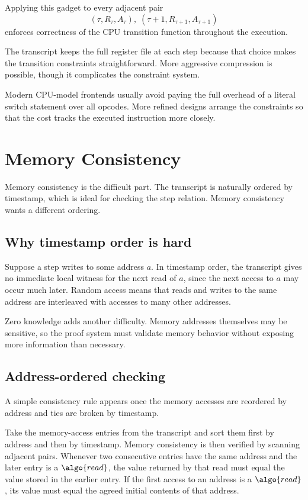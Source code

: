 \documentclass[11pt]{article}
\begin{document}
Applying this gadget to every adjacent pair
\[
  (\tau, R_\tau, A_\tau),\; (\tau+1, R_{\tau+1}, A_{\tau+1})
\]
enforces correctness of the CPU transition function throughout the execution.

The transcript keeps the full register file at each step because that choice makes the transition constraints straightforward. More aggressive compression is possible, though it complicates the constraint system.

Modern CPU-model frontends usually avoid paying the full overhead of a literal switch statement over all opcodes. More refined designs arrange the constraints so that the cost tracks the executed instruction more closely.

\section{Memory Consistency}

Memory consistency is the difficult part. The transcript is naturally ordered by timestamp, which is ideal for checking the step relation. Memory consistency wants a different ordering.

\subsection{Why timestamp order is hard}

Suppose a step writes to some address $a$. In timestamp order, the transcript gives no immediate local witness for the next read of $a$, since the next access to $a$ may occur much later. Random access means that reads and writes to the same address are interleaved with accesses to many other addresses.

Zero knowledge adds another difficulty. Memory addresses themselves may be sensitive, so the proof system must validate memory behavior without exposing more information than necessary.

\subsection{Address-ordered checking}

A simple consistency rule appears once the memory accesses are reordered by address and ties are broken by timestamp.

\begin{proposition}
Take the memory-access entries from the transcript and sort them first by address and then by timestamp. Memory consistency is then verified by scanning adjacent pairs. Whenever two consecutive entries have the same address and the later entry is a $\algo{read}$, the value returned by that read must equal the value stored in the earlier entry. If the first access to an address is a $\algo{read}$, its value must equal the agreed initial contents of that address.
\end{proposition}
\end{document}
